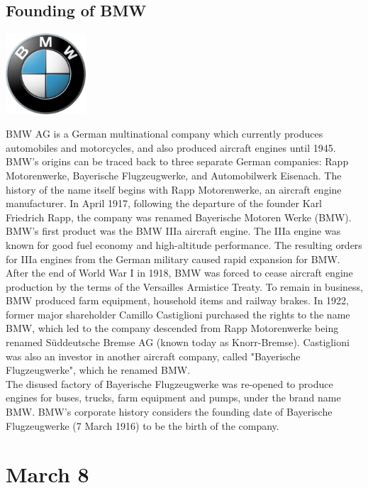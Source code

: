 \documentclass[11pt]{report}
\begin{document}
\subsection{Founding of BMW}
\vspace{2mm}\begin{center}\includegraphics[width=3cm]{./img/bmwLogo.jpg}\end{center}
BMW AG is a German multinational company which currently produces automobiles and motorcycles, and also produced aircraft engines until 1945.\\ \indent BMW's origins can be traced back to three separate German companies: Rapp Motorenwerke, Bayerische Flugzeugwerke, and Automobilwerk Eisenach. The history of the name itself begins with Rapp Motorenwerke, an aircraft engine manufacturer. In April 1917, following the departure of the founder Karl Friedrich Rapp, the company was renamed Bayerische Motoren Werke (BMW). BMW's first product was the BMW IIIa aircraft engine. The IIIa engine was known for good fuel economy and high-altitude performance. The resulting orders for IIIa engines from the German military caused rapid expansion for BMW.\\
\indent After the end of World War I in 1918, BMW was forced to cease aircraft engine production by the terms of the Versailles Armistice Treaty. To remain in business, BMW produced farm equipment, household items and railway brakes. In 1922, former major shareholder Camillo Castiglioni purchased the rights to the name BMW, which led to the company descended from Rapp Motorenwerke being renamed Süddeutsche Bremse AG (known today as Knorr-Bremse). Castiglioni was also an investor in another aircraft company, called "Bayerische Flugzeugwerke", which he renamed BMW.\\ \indent The disused factory of Bayerische Flugzeugwerke was re-opened to produce engines for buses, trucks, farm equipment and pumps, under the brand name BMW. BMW's corporate history considers the founding date of Bayerische Flugzeugwerke (7 March 1916) to be the birth of the company.
\section{March 8}
\end{document}
